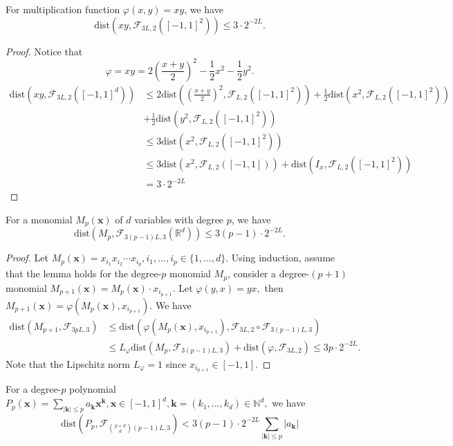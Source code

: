 \begin{lemma}\label{lem:xy}
For multiplication function $\varphi(x,y) = xy$, we have 
$$
\mbox{dist}(xy,\mathcal{F}_{3L,2}([-1,1]^2))\le 3\cdot 2^{-2L}.
$$
\begin{proof}
Notice that
$$
\varphi = xy = 2\left(\frac{x+y}{2} \right)^2-\frac{1}{2}x^2-\frac{1}{2}y^2.
$$
\[
\begin{split}
\mbox{dist}(xy,\mathcal{F}_{3L,2}([-1,1]^d))&\le2\mbox{dist}(\left(\frac{x+y}{2} \right)^2,\mathcal{F}_{L,2}([-1,1]^2)) + \frac{1}{2} \mbox{dist}(x^2,\mathcal{F}_{L,2}([-1,1]^2)) \\
 &+\frac{1}{2} \mbox{dist}(y^2,\mathcal{F}_{L,2}([-1,1]^2))\\
 &\le 3\mbox{dist}(x^2,\mathcal{F}_{L,2}([-1,1]^2))\\
 &\le 3\mbox{dist}(x^2,\mathcal{F}_{L,2}([-1,1])) + \mbox{dist}(I_x,\mathcal{F}_{L,2}([-1,1]^2))\\
 &= 3\cdot 2^{-2L}
\end{split}
\]
\end{proof}
\end{lemma}

\begin{lemma}
For a monomial $M_p(\bm x)$ of $d$ variables with degree $p$, we have
$$
\mbox{dist}(M_p,\mathcal F_{3(p-1)L,3}(\mathbb R^d))\le 3(p-1)\cdot 2^{-2L}.
$$
\end{lemma}

\begin{proof}
Let $M_p(\bm x)=x_{i_1}x_{i_2}\cdots x_{i_p},i_1,...,i_p\in\{1,...,d\}.$ Using induction, assume that the lemma holds for the degree-$p$ monomial $M_p$, consider a degree-$(p+1)$ monomial $M_{p+1}(\bm{x}) = M_p(\bm{x})\cdot x_{i_{p+1}}$. Let $\varphi(y,x) = yx,$ then $M_{p+1}(\bm x) = \varphi(M_p(\bm{x}),x_{i_{p+1}})$. We have
\[
\begin{split}
\mbox{dist}(M_{p+1},\mathcal{F}_{3pL,3})&\le \mbox{dist}(\varphi(M_p(\bm x),x_{i_{p+1}}),\mathcal F_{3L,2}\circ \mathcal F_{3(p-1)L,3})\\
& \le L_{\varphi}\mbox{dist}(M_p,\mathcal{F}_{3(p-1)L,3})+\mbox{dist}(\varphi,\mathcal F_{3L,2})\le 3p\cdot 2^{-2L}.
\end{split}
\]
Note that the Lipschitz norm $L_{\varphi}=1$ since $x_{i_{p+1}}\in [-1,1].$
\end{proof}

\begin{lemma}
For a degree-$p$ polynomial $P_p(\bm{x}) = \sum_{|\bm{k}|\le p}a_{\bm k}\bm x^{\bm k},\bm x\in [-1,1]^d,\bm k = (k_1,...,k_d)\in\mathbb{N}^d,$ we have 
\[
\mbox{dist}\left(P_p,\mathcal F_{\binom{p+d}{d}(p-1)L,3}\right)<3(p-1)\cdot 2^{-2L}\sum_{|\bm k|\le p}|a_{\bm k}|
\]
\end{lemma}\label{lem:poly}

